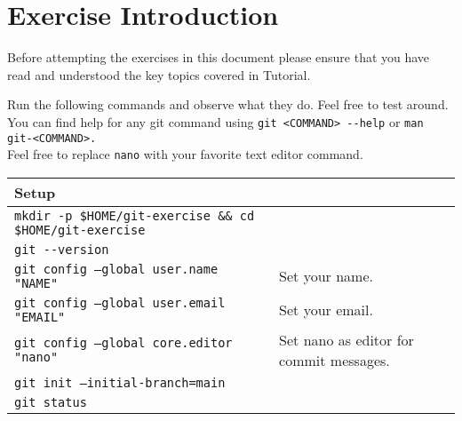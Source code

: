 \documentclass[paper=a4]{scrartcl}
\newcommand{\theexercisenumber}{1} %
\newcommand{\thedate}{2023.04.17} %
\let\oldtexttt\texttt
\renewcommand{\texttt}[1]{
  \colorbox{bgcolor}{\oldtexttt{#1}}
  }
\begin{document}
\date{\thedate}
\exercise{\theexercisenumber}

\parskip 8pt
\makesheetheader

\section*{Exercise Introduction}
Before attempting the exercises in this document please ensure that you have read and understood the key topics covered in Tutorial.

\tableofcontents

\bigskip

Run the following commands and observe what they do. Feel free to test around. \\
You can find help for any git command using \texttt{git <COMMAND> -{}-help} or \texttt{man git-<COMMAND>.}\\
Feel free to replace \texttt{nano} with your favorite text editor command.

\noindent
\begin{longtable}{ p{} p{}}
        \textbf{Setup}\\
        \hline
        \texttt{mkdir -p \$HOME/git-exercise \&\& cd \$HOME/git-exercise}\\
        \texttt{git -{}-version}\\
        \texttt{git config --global user.name "NAME"} & Set your name.\\
        \texttt{git config --global user.email "EMAIL"} & Set your email.\\
        \texttt{git config --global core.editor "nano"} & Set nano as editor for commit messages.\\
        \texttt{git init --initial-branch=main}\\
        \texttt{git status}\\
\end{longtable}
\end{document}
